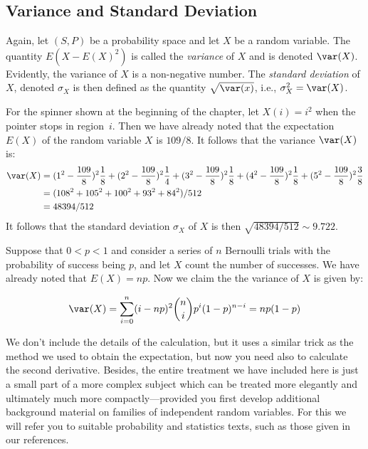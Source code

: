 \subsection{Variance and Standard Deviation}

Again, let $(S,P)$ be a probability space and let $X$ be a random variable.
The quantity $E(X-E(X)^2)$ is called the \textit{variance} of $X$ and
is denoted $\var(X)$.  Evidently, the variance of $X$ is a non-negative
number.  The \textit{standard deviation} of $X$, denoted $\sigma_X$ is then
defined as the quantity $\sqrt{\var(x)}$, i.e., $\sigma_X^2 =\var(X)$.

\begin{example}
For the spinner shown at the beginning of the chapter, let $X(i)=i^2$ when
the pointer stops in region~$i$.  Then we have already noted that the
expectation $E(X)$ of the random variable $X$ is $109/8$.  It follows that
the variance $\var(X)$ is:
\begin{align*}
\var(X)&=(1^2-\frac{109}{8})^2\frac{1}{8}+(2^2-\frac{109}{8})^2\frac{1}{4}+
          (3^2-\frac{109}{8})^2\frac{1}{8}+(4^2-\frac{109}{8})^2\frac{1}{8}+
          (5^2-\frac{109}{8})^2\frac{3}{8}\\
       &=(108^2+105^2+100^2+93^2+84^2)/512\\
       &=48394/512
\end{align*}
It follows that the standard deviation $\sigma_X$ of $X$ is then
$\sqrt{48394/512}\sim 9.722$.
\end{example}

\begin{example}
Suppose that $0<p<1$ and consider a series of $n$ Bernoulli trials with 
the probability of success being $p$, and let $X$ count the number of 
successes.  We have already noted that $E(X)=np$.  Now we claim the the 
variance of $X$ is given by:

\[
\var(X)=\sum_{i=0}^n (i-np)^2\binom{n}{i}p^i(1-p)^{n-i} = np(1-p)
\]

We don't include the details of the calculation, but it uses a similar
trick as the method we used to obtain the expectation, but now you need
also to calculate the second derivative.  Besides, the entire treatment we
have included here is just a small part of a more complex subject which
can be treated more elegantly and ultimately much more compactly---provided
you first develop additional background material on families of
independent random variables.   For this we will refer
you to suitable probability and statistics texts, such as those given
in our references.
\end{example}

